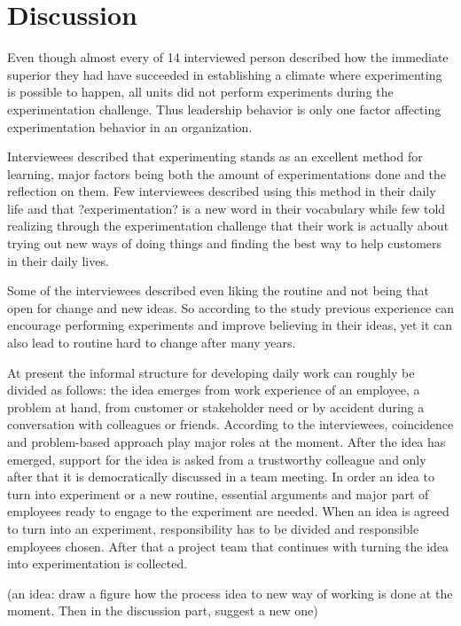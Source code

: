 \chapter{Discussion}
Even though almost every of 14 interviewed person described how the immediate superior they had have succeeded in establishing a climate where experimenting is possible to happen, all units did not perform experiments during the experimentation challenge. Thus leadership behavior is only one factor affecting experimentation behavior in an organization. 

Interviewees described that experimenting stands as an excellent method for learning, major factors being both the amount of experimentations done and the reflection on them. Few interviewees described using this method in their daily life and that ?experimentation? is a new word in their vocabulary while few told realizing through the experimentation challenge that their work is actually about trying out new ways of doing things and finding the best way to help customers in their daily lives.

Some of the interviewees described even liking the routine and not being that open for change and new ideas. So according to the study previous experience can encourage performing experiments and improve believing in their ideas, yet it can also lead to routine hard to change after many years. 


At present the informal structure for developing daily work can roughly be divided as follows: the idea emerges from work experience of an employee, a problem at hand, from customer or stakeholder need or by accident during a conversation with colleagues or friends. According to the interviewees, coincidence and problem-based approach play major roles at the moment. After the idea has emerged, support for the idea is asked from a trustworthy colleague and only after that it is democratically discussed in a team meeting. In order an idea to turn into experiment or a new routine, essential arguments and major part of employees ready to engage to the experiment are needed. When an idea is agreed to turn into an experiment, responsibility has to be divided and responsible employees chosen. After that a project team that continues with turning the idea into experimentation is collected. 

(an idea: draw a figure how the process idea to new way of working is done at the moment. Then in the discussion part, suggest a new one) 

